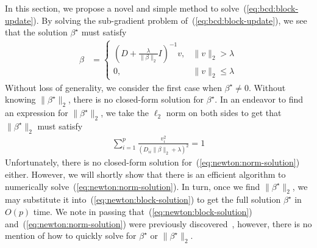 \documentclass[fontsize=11pt]{article}
\newcommand{\pr}[1]{\left(#1\right)}
\newcommand{\norm}[1]{\|#1\|}
\begin{document}
In this section, we propose a novel and simple method to solve~(\ref{eq:bcd:block-update}).
By solving the sub-gradient problem of~(\ref{eq:bcd:block-update}),
we see that the solution $\beta^\star$ must satisfy
\begin{align}
    \beta
    &=
    \begin{cases}
    \pr{D + \frac{\lambda}{\norm{\beta}_2} I}^{-1} v ,& \norm{v}_2 > \lambda \\
    0 ,& \norm{v}_2 \leq \lambda
    \end{cases}
    \label{eq:newton:block-solution}
\end{align}
Without loss of generality, we consider the first case when $\beta^\star \neq 0$.
Without knowing $\norm{\beta^\star}_2$, there is no closed-form solution for $\beta^\star$.
In an endeavor to find an expression for $\norm{\beta^\star}_2$,
we take the $\ell_2$ norm on both sides to get that $\norm{\beta^\star}_2$ must satisfy
\begin{align}
    \sum\limits_{i=1}^p
    \frac{v_i^2}{(D_{ii} \norm{\beta}_2 + \lambda)^2}
    =
    1
    \label{eq:newton:norm-solution}
\end{align}
Unfortunately, there is no closed-form solution for~(\ref{eq:newton:norm-solution}) either.
However, we will shortly show that there is an efficient algorithm 
to numerically solve~(\ref{eq:newton:norm-solution}).
In turn, once we find $\norm{\beta^\star}_2$, we may substitute it
into~(\ref{eq:newton:block-solution}) to get the full solution $\beta^\star$ in $O(p)$ time.
We note in passing that~(\ref{eq:newton:block-solution}) and~(\ref{eq:newton:norm-solution})
were previously discovered~\citep{sls:2016},
however, there is no mention of how to quickly solve for $\beta^\star$ or $\norm{\beta^\star}_2$.
\end{document}
